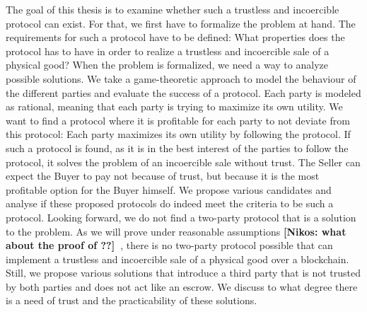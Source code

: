 \documentclass{cacthesis}
\newcommand{\authnote}[3]{{ \footnotesize \textbf{#1[#2: #3]~}}}
\newcommand{\niknote}[1]{\authnote{\color{red}}{Nikos}{#1}}
\begin{document}
The goal of this thesis is to examine whether such a trustless and incoercible protocol can exist. For that, we first have to formalize the problem at hand. The requirements for such a protocol have to be defined: What properties does the protocol has to have in order to realize a trustless and incoercible sale of a physical good? When the problem is formalized, we need a way to analyze possible solutions.
We take a game-theoretic \cite{leyton-brown_essentials_2008} approach to model the behaviour of the different parties and evaluate the success of a protocol. Each party is modeled as rational, meaning that each party is trying to maximize its own utility. We want to find a protocol where it is profitable for each party to not deviate from this protocol: Each party maximizes its own utility by following the protocol. If such a protocol is found, as it is in the best interest of the parties to follow the protocol, it solves the problem of an incoercible sale without trust. The Seller can expect the Buyer to pay not because of trust, but because it is the most profitable option for the Buyer himself. We propose various candidates and analyse if these proposed protocols do indeed meet the criteria to be such a protocol. Looking forward, we do not find a two-party protocol that is a solution to the problem. As we will prove under reasonable assumptions \niknote{what about the proof of \cite{goharshady_irrationality_2021}??}, there is no two-party protocol possible that can implement a trustless and incoercible sale of a physical good over a blockchain. Still, we propose various solutions that introduce a third party that is not trusted by both parties and does not act like an escrow. We discuss to what degree there is a need of trust and the practicability of these solutions.  \newline

\end{document}
